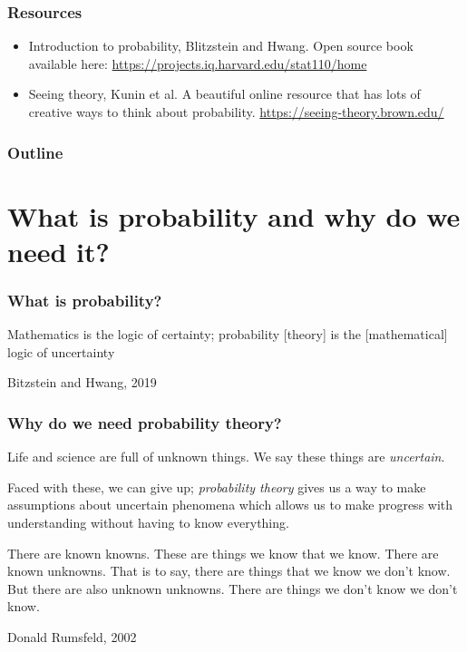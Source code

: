 \documentclass{beamer}
\begin{document}
	\begin{frame}
		\frametitle{Resources}
		
		\begin{itemize}
			\item Introduction to probability, Blitzstein and Hwang. Open source book available here: \url{https://projects.iq.harvard.edu/stat110/home}
			\item Seeing theory, Kunin et al. A beautiful online resource that has lots of creative ways to think about probability. \url{https://seeing-theory.brown.edu/}
		\end{itemize}
		
	\end{frame}

	\begin{frame}
		\frametitle{Outline}
		\tableofcontents
	\end{frame}

	\section{What is probability and why do we need it?}
	\frame{\tableofcontents[currentsection]}
	
	\begin{frame}
		\frametitle{What is probability?}
		\epigraph{Mathematics is the logic of certainty; probability [theory] is the [mathematical] logic of uncertainty}{Bitzstein and Hwang, 2019}
		
	\end{frame}

	\begin{frame}
		\frametitle{Why do we need probability theory?}
		
		Life and science are full of unknown things. We say these things are \textit{uncertain}.
		
		Faced with these, we can give up; \textit{probability theory} gives us a way to make assumptions about uncertain phenomena which allows us to make progress with understanding without having to know everything.
		
		\epigraph{There are known knowns. These are things we know that we know. There are known unknowns. That is to say, there are things that we know we don't know. But there are also unknown unknowns. There are things we don't know we don't know.}{Donald Rumsfeld, 2002}
		
	\end{frame}
	
\end{document}
